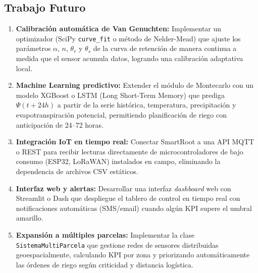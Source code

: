 \documentclass[12pt,a4paper]{article}
\begin{document}
\subsection{Trabajo Futuro}

\begin{enumerate}

    \item \textbf{Calibración automática de Van Genuchten:} Implementar un optimizador (SciPy \texttt{curve\_fit} o método de Nelder-Mead) que ajuste los parámetros $\alpha$, $n$, $\theta_r$ y $\theta_s$ de la curva de retención de manera continua a medida que el sensor acumula datos, logrando una calibración adaptativa local.

    \item \textbf{Machine Learning predictivo:} Extender el módulo de Montecarlo con un modelo XGBoost o LSTM (Long Short-Term Memory) que prediga $\Psi(t+24h)$ a partir de la serie histórica, temperatura, precipitación y evapotranspiración potencial, permitiendo planificación de riego con anticipación de 24--72 horas.

    \item \textbf{Integración IoT en tiempo real:} Conectar SmartRoot a una API MQTT o REST para recibir lecturas directamente de micro\-controladores de bajo consumo (ESP32, LoRaWAN) instalados en campo, eliminando la dependencia de archivos CSV estáticos.

    \item \textbf{Interfaz web y alertas:} Desarrollar una interfaz \textit{dashboard} web con Streamlit o Dash que despliegue el tablero de control en tiempo real con notificaciones automáticas (SMS/email) cuando algún KPI supere el umbral amarillo.

    \item \textbf{Expansión a múltiples parcelas:} Implementar la clase \texttt{SistemaMultiParcela} que gestione redes de sensores distribuidas geoespacialmente, calculando KPI por zona y priorizando automáticamente las órdenes de riego según criticidad y distancia logística.

\end{enumerate}
\end{document}
